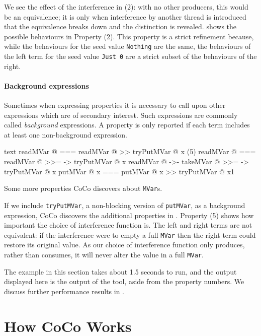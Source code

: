 We see the effect of the interference in (2): with no other producers,
this would be an equivalence; it is only when interference by another
thread is introduced that the equivalence breaks down and the
distinction is revealed.   shows the possible
behaviours in Property (2).  This property is a strict refinement
because, while the behaviours for the seed value \verb|Nothing| are
the same, the behaviours of the left term for the seed value
\verb|Just 0| are a strict subset of the behaviours of the right.

\paragraph{Background expressions}
Sometimes when expressing properties it is necessary to call upon
other expressions which are of secondary interest.  Such expressions
are commonly called \emph{background} expressions.  A property is only
reported if each term includes at least one non-background expression.

\begin{listing}
\centering
\begin{cminted}{text}
      readMVar @  ===  readMVar @ >> tryPutMVar @ x
(5)   readMVar @  ===  readMVar @ >>= \x -> tryPutMVar @ x
      readMVar @  ->-  takeMVar @ >>= \x -> tryPutMVar @ x
     putMVar @ x  ===  putMVar @ x >> tryPutMVar @ x1
\end{cminted}
\caption{Some more properties CoCo discovers about \texttt{MVar}s.}\label{lst:mvar_props2}
\end{listing}

If we include \verb|tryPutMVar|, a non-blocking version of
\verb|putMVar|, as a background expression, CoCo discovers the
additional properties in .  Property (5) shows
how important the choice of interference function is.  The left and
right terms are not equivalent: if the interference were to empty a
full \verb|MVar| then the right term could restore its original value.
As our choice of interference function only produces, rather than
consumes, it will never alter the value in a full \verb|MVar|.

The example in this section takes about 1.5 seconds to run, and the
output displayed here is the output of the tool, aside from the
property numbers.  We discuss further performance results in
.

\section{How CoCo Works}
\label{sec:coco-hiw}

